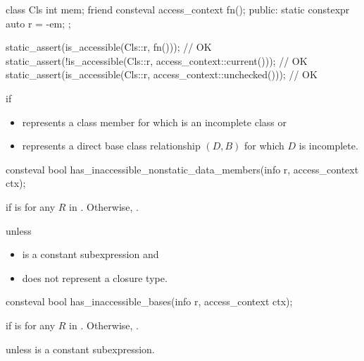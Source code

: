 \begin{itemdescr}
\begin{example}
\begin{codeblock}
class Cls {
  int mem;
  friend consteval access_context fn();
public:
  static constexpr auto r = ^^mem;
};

static_assert(is_accessible(Cls::r, fn()));                             // OK
static_assert(!is_accessible(Cls::r, access_context::current()));       // OK
static_assert(is_accessible(Cls::r, access_context::unchecked()));      // OK
\end{codeblock}
\end{example}

\pnum
\throws
{} if
\begin{itemize}
\item
   represents a class member
  for which  is an incomplete class or
\item
   represents a direct base class relationship $(D, B)$
  for which $D$ is incomplete.
\end{itemize}
\end{itemdescr}

%
\begin{itemdecl}
consteval bool has_inaccessible_nonstatic_data_members(info r, access_context ctx);
\end{itemdecl}

\begin{itemdescr}
\pnum
\returns
{} if  is 
for any $R$ in .
Otherwise, .

\pnum
\throws
{} unless
\begin{itemize}
\item
  is a constant subexpression and
\item
   does not represent a closure type.
\end{itemize}
\end{itemdescr}

\begin{itemdecl}
consteval bool has_inaccessible_bases(info r, access_context ctx);
\end{itemdecl}

\begin{itemdescr}
\pnum
\returns
{} if  is 
for any $R$ in .
Otherwise, .

\pnum
\throws
{} unless
is a constant subexpression.
\end{itemdescr}

